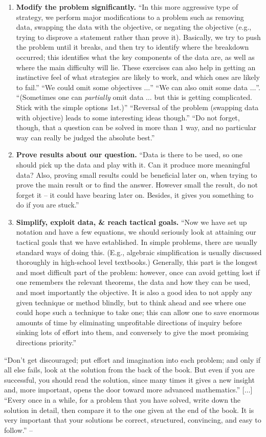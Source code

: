 \documentclass[oneside]{book}
\numberwithin{equation}{section}
\begin{document}
\begin{enumerate}
	\item \textbf{Modify the problem significantly.} ``In this more aggressive type of strategy, we perform major modifications to a problem such as removing data, swapping the data with the objective, or negating the objective (e.g., trying to disprove a statement rather than prove it). Basically, we try to push the problem until it breaks, and then try to identify where the breakdown occurred; this identifies what the key components of the data are, as well as where the main difficulty will lie. These exercises can also help in getting an instinctive feel of what strategies are likely to work, and which ones are likely to fail.'' ``We could omit some objectives $\ldots$'' ``We can also omit some data $\ldots$''. ``(Sometimes one can \textit{partially} omit data $\ldots$ but this is getting complicated. Stick with the simple options 1st.)'' ``Reversal of the problem (swapping data with objective) leads to some interesting ideas though.'' ``Do not forget, though, that a question can be solved in more than 1 way, and no particular way can really be judged the absolute best.''
	\item \textbf{Prove results about our question.} ``Data is there to be used, so one should pick up the data and play with it. Can it produce more meaningful data? Also, proving small results could be beneficial later on, when trying to prove the main result or to find the answer. However small the result, do not forget it -- it could have bearing later on. Besides, it gives you something to do if you are stuck.''
	\item \textbf{Simplify, exploit data, \& reach tactical goals.} ``Now we have set up notation and have a few equations, we should seriously look at attaining our tactical goals that we have established. In simple problems, there are usually standard ways of doing this. (E.g., algebraic simplification is usually discussed thoroughly in high-school level textbooks.) Generally, this part is the longest and most difficult part of the problem: however, once can avoid getting lost if one remembers the relevant theorems, the data and how they can be used, and most importantly the objective. It is also a good idea to not apply any given technique or method blindly, but to think ahead and see where one could hope such a technique to take one; this can allow one to save enormous amounts of time by eliminating unprofitable directions of inquiry before sinking lots of effort into them, and conversely to give the most promising directions priority.''
\end{enumerate}
``Don't get discouraged; put effort and imagination into each problem; and only if all else fails, look at the solution from the back of the book. But even if you are successful, you should read the solution, since many times it gives a new insight and, more important, opens the door toward more advanced mathematics.'' [$\ldots$] ``Every once in a while, for a problem that you have solved, write down the solution in detail, then compare it to the one given at the end of the book. It is very important that your solutions be correct, structured, convincing, and easy to follow.'' -- \cite[A Study Guide, p. xvii]{Gelca_Andreescu2017}
\end{document}
